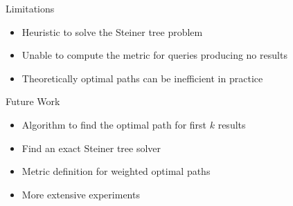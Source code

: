 \begin{frame}{Limitations}
    \begin{itemize}
        \item Heuristic to solve the Steiner tree problem
        \item Unable to compute the metric for queries producing no results
        \item Theoretically optimal paths can be inefficient in practice
    \end{itemize}
\end{frame}

\begin{frame}{Future Work}
    \begin{itemize}
        \item Algorithm to find the optimal path for first $ k $ results
        \item Find an exact Steiner tree solver
        \item Metric definition for weighted optimal paths
        \item More extensive experiments
    \end{itemize}
\end{frame}